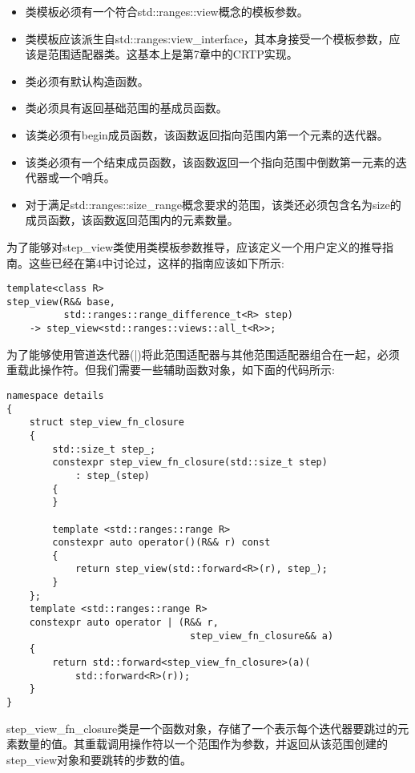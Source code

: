 \begin{itemize}
\item
类模板必须有一个符合std::ranges::view概念的模板参数。

\item
类模板应该派生自std::ranges:view\_interface，其本身接受一个模板参数，应该是范围适配器类。这基本上是第7章中的CRTP实现。

\item
类必须有默认构造函数。

\item
类必须具有返回基础范围的基成员函数。

\item
该类必须有begin成员函数，该函数返回指向范围内第一个元素的迭代器。

\item
该类必须有一个结束成员函数，该函数返回一个指向范围中倒数第一元素的迭代器或一个哨兵。

\item
对于满足std::ranges::size\_range概念要求的范围，该类还必须包含名为size的成员函数，该函数返回范围内的元素数量。
\end{itemize}

为了能够对step\_view类使用类模板参数推导，应该定义一个用户定义的推导指南。这些已经在第4中讨论过，这样的指南应该如下所示:

\begin{lstlisting}[style=styleCXX]
template<class R>
step_view(R&& base,
		  std::ranges::range_difference_t<R> step)
	-> step_view<std::ranges::views::all_t<R>>;
\end{lstlisting}

为了能够使用管道迭代器(|)将此范围适配器与其他范围适配器组合在一起，必须重载此操作符。但我们需要一些辅助函数对象，如下面的代码所示:

\begin{lstlisting}[style=styleCXX]
namespace details
{
	struct step_view_fn_closure
	{
		std::size_t step_;
		constexpr step_view_fn_closure(std::size_t step)
			: step_(step)
		{
		}
	
		template <std::ranges::range R>
		constexpr auto operator()(R&& r) const
		{
			return step_view(std::forward<R>(r), step_);
		}
	};
	template <std::ranges::range R>
	constexpr auto operator | (R&& r,
								step_view_fn_closure&& a)
	{
		return std::forward<step_view_fn_closure>(a)(
			std::forward<R>(r));
	}
}
\end{lstlisting}

step\_view\_fn\_closure类是一个函数对象，存储了一个表示每个迭代器要跳过的元素数量的值。其重载调用操作符以一个范围作为参数，并返回从该范围创建的step\_view对象和要跳转的步数的值。

